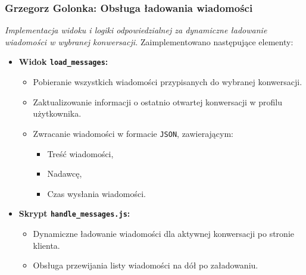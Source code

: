 \documentclass[12pt,a4paper,oneside]{article}
\theoremstyle{definition}
\numberwithin{equation}{section}
\begin{document}
\subsubsection{Grzegorz Golonka: Obsługa ładowania wiadomości}
\label{section:1.3.33}
\textit{
Implementacja widoku i logiki odpowiedzialnej za dynamiczne ładowanie wiadomości w wybranej konwersacji.
}
Zaimplementowano następujące elementy:
\begin{itemize}
    \item \textbf{Widok \texttt{load\_messages}:}
    \begin{itemize}
        \item Pobieranie wszystkich wiadomości przypisanych do wybranej konwersacji.
        \item Zaktualizowanie informacji o ostatnio otwartej konwersacji w profilu użytkownika.
        \item Zwracanie wiadomości w formacie \texttt{JSON}, zawierającym:
        \begin{itemize}
            \item Treść wiadomości,
            \item Nadawcę,
            \item Czas wysłania wiadomości.
        \end{itemize}
    \end{itemize}
    \item \textbf{Skrypt \texttt{handle\_messages.js}:}
    \begin{itemize}
        \item Dynamiczne ładowanie wiadomości dla aktywnej konwersacji po stronie klienta.
        \item Obsługa przewijania listy wiadomości na dół po załadowaniu.
    \end{itemize}
\end{itemize}
%
%
\end{document}
